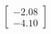 \documentclass[preview]{standalone}
\begin{document}
\begin{align*}
\begin{bmatrix} -2.08 \\ -4.10 \end{bmatrix}
\end{align*}
\end{document}
